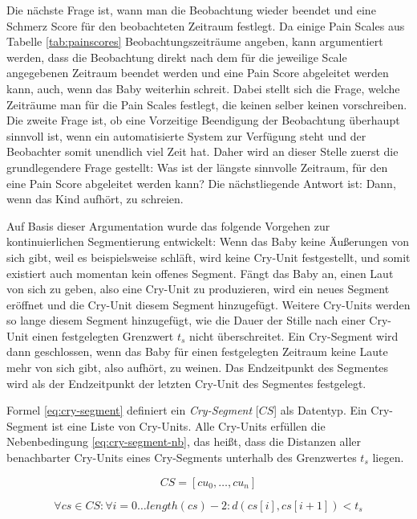 Die nächste Frage ist, wann man die Beobachtung wieder beendet und eine Schmerz Score für den beobachteten Zeitraum festlegt. Da einige Pain Scales aus Tabelle \ref{tab:painscores} Beobachtungszeiträume angeben, kann argumentiert werden, dass die Beobachtung direkt nach dem für die jeweilige Scale angegebenen Zeitraum beendet werden und eine Pain Score abgeleitet werden kann, auch, wenn das Baby weiterhin schreit. Dabei stellt sich die Frage, welche Zeiträume man für die Pain Scales festlegt, die keinen selber keinen vorschreiben. Die zweite Frage ist, ob eine Vorzeitige Beendigung der Beobachtung überhaupt sinnvoll ist, wenn ein automatisierte System zur Verfügung steht und der Beobachter somit \glqq unendlich viel Zeit hat\grqq . Daher wird an dieser Stelle zuerst die grundlegendere Frage gestellt: Was ist der längste sinnvolle Zeitraum, für den eine Pain Score abgeleitet werden kann? Die nächstliegende Antwort ist: Dann, wenn das Kind aufhört, zu schreien.

Auf Basis dieser Argumentation wurde das folgende Vorgehen zur kontinuierlichen Segmentierung entwickelt: Wenn das Baby keine Äußerungen von sich gibt, weil es beispielsweise schläft, wird keine Cry-Unit festgestellt, und somit existiert auch momentan kein offenes Segment. Fängt das Baby an, einen Laut von sich zu geben, also eine Cry-Unit zu produzieren, wird ein neues Segment eröffnet und die Cry-Unit diesem Segment hinzugefügt. Weitere Cry-Units werden so lange diesem Segment hinzugefügt, wie die Dauer der Stille nach einer Cry-Unit einen festgelegten Grenzwert $t_{s}$ nicht überschreitet. Ein Cry-Segment wird dann geschlossen, wenn das Baby für einen festgelegten Zeitraum keine Laute mehr von sich gibt, also \glqq aufhört, zu weinen\grqq{}. Das Endzeitpunkt des Segmentes wird als der Endzeitpunkt der letzten Cry-Unit des Segmentes festgelegt.

Formel \ref{eq:cry-segment}  definiert ein \emph{Cry-Segment} [$CS$] als Datentyp. Ein Cry-Segment ist eine Liste von Cry-Units. Alle Cry-Units erfüllen die Nebenbedingung \ref{eq:cry-segment-nb}, das heißt, dass die Distanzen aller benachbarter Cry-Units eines Cry-Segments unterhalb des Grenzwertes $t_{s}$ liegen.

\begin{equation}
CS = [cu_0 ,  \ldots,  cu_n]
\label{eq:cry-segment}
\end{equation}

\begin{equation}
\forall cs \in CS: \forall i = 0 \ldots length(cs)-2 : d(cs[i], cs[i+1]) < t_{s}
\label{eq:cry-segment-nb}
\end{equation}

